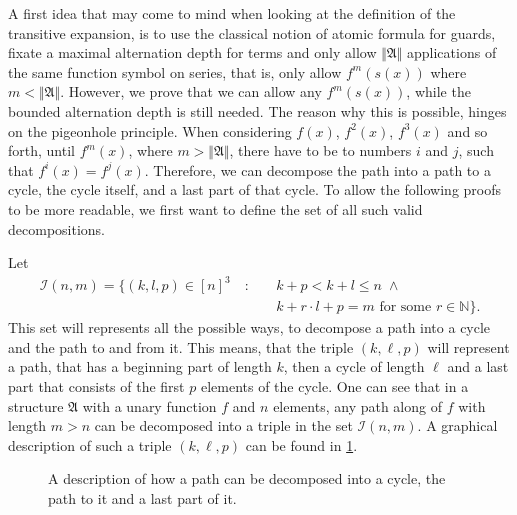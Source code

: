 A first idea that may come to mind when looking at the definition of the transitive expansion, is to use the classical notion of atomic formula for guards, fixate a maximal alternation depth for terms and only allow $\Vert \mathfrak{A}\Vert$ applications of the same function symbol on series, that is, only allow $f^m(s(x))$ where $m<\Vert\mathfrak A\Vert$.
However, we prove that we can allow any $f^m(s(x))$, while the bounded alternation depth is still needed.
The reason why this is possible, hinges on the pigeonhole principle.
When considering $f(x)$, $f^2(x)$, $f^3(x)$ and so forth, until $f^m(x)$, where $m>\Vert\mathfrak A\Vert$, there have to be to numbers $i$ and $j$, such that $f^i(x)=f^j(x)$.
Therefore, we can decompose the path into a path to a cycle, the cycle itself, and a last part of that cycle.
To allow the following proofs to be more readable, we first want to define the set of all such valid decompositions.

Let 
\begin{align*}
	\mathcal I(n,m)=\{(k,l,p)\in [n]^3 \quad:\quad & k+p < k+l \leq n \; \land \\
	& k+r\cdot l + p = m \text{ for some } r\in \mathbb N\}.
\end{align*}
This set will represents all the possible ways, to decompose a path into a cycle and the path to and from it.
This means, that the triple $(k,\ell,p)$ will represent a path, that has a beginning part of length $k$, then a cycle of length $\ell$ and a last part that consists of the first $p$ elements of the cycle.
One can see that in a structure $\mathfrak A$ with a unary function $f$ and $n$ elements, any path along of $f$ with length $m>n$ can be decomposed into a triple in the set $\mathcal I(n,m)$.
A graphical description of such a triple $(k,\ell,p)$ can be found in \cref{PathDecompositionPrinciple}.

\begin{figure}[h]
	\centering
	
	\caption{A description of how a path can be decomposed into a cycle, the path to it and a last part of it.}
	\label{PathDecompositionPrinciple}
\end{figure}

